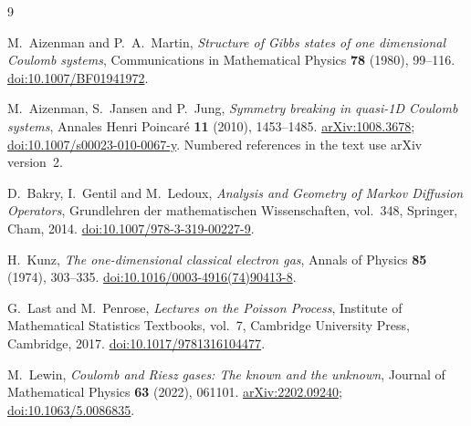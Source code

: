 \documentclass[11pt,reqno]{amsart}
\theoremstyle{definition}
\theoremstyle{remark}
\newcommand{\1}{\mathbf 1}
\numberwithin{equation}{section}
\begin{document}
\begin{thebibliography}{9}

M.~Aizenman and P.~A.~Martin,
\emph{Structure of Gibbs states of one dimensional Coulomb systems},
Communications in Mathematical Physics \textbf{78} (1980), 99--116.
\href{https://doi.org/10.1007/BF01941972}{doi:10.1007/BF01941972}.

M.~Aizenman, S.~Jansen and P.~Jung,
\emph{Symmetry breaking in quasi-1D Coulomb systems},
Annales Henri Poincar\'e \textbf{11} (2010), 1453--1485.
\href{https://arxiv.org/abs/1008.3678}{arXiv:1008.3678};
\href{https://doi.org/10.1007/s00023-010-0067-y}{doi:10.1007/s00023-010-0067-y}.
Numbered references in the text use arXiv version~2.

D.~Bakry, I.~Gentil and M.~Ledoux,
\emph{Analysis and Geometry of Markov Diffusion Operators},
Grundlehren der mathematischen Wissenschaften, vol.~348,
Springer, Cham, 2014.
\href{https://doi.org/10.1007/978-3-319-00227-9}{doi:10.1007/978-3-319-00227-9}.

H.~Kunz, \emph{The one-dimensional classical electron gas},
Annals of Physics \textbf{85} (1974), 303--335.
\href{https://doi.org/10.1016/0003-4916(74)90413-8}{doi:10.1016/0003-4916(74)90413-8}.

G.~Last and M.~Penrose, \emph{Lectures on the Poisson Process},
Institute of Mathematical Statistics Textbooks, vol.~7,
Cambridge University Press, Cambridge, 2017.
\href{https://doi.org/10.1017/9781316104477}{doi:10.1017/9781316104477}.

M.~Lewin, \emph{Coulomb and Riesz gases: The known and the unknown},
Journal of Mathematical Physics \textbf{63} (2022), 061101.
\href{https://arxiv.org/abs/2202.09240}{arXiv:2202.09240};
\href{https://doi.org/10.1063/5.0086835}{doi:10.1063/5.0086835}.

\end{thebibliography}
\end{document}
